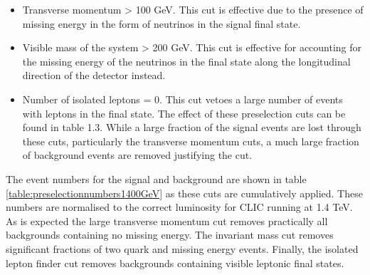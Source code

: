 \begin{itemize}
\item Transverse momentum > 100 GeV. This cut is effective due to the presence of missing energy in the form of neutrinos in the signal final state.
\item Visible mass of the system > 200 GeV. This cut is effective for accounting for the missing energy of the neutrinos in the final state along the longitudinal direction of the detector instead.
\item Number of isolated leptons = 0. This cut vetoes a large number of events with leptons in the final state.
The effect of these preselection cuts can be found in table 1.3. While a large fraction of the signal events are lost through these cuts, particularly the transverse momentum cuts, a much large fraction of background events are removed justifying the cut.
\end{itemize}

The event numbers for the signal and background are shown in table \ref{table:preselectionnumbers1400GeV} as these cuts are cumulatively applied.  These numbers are normalised to the correct luminosity for CLIC running at 1.4 TeV.  As is expected the large transverse momentum cut removes practically all backgrounds containing no missing energy.  The invariant mass cut removes significant fractions of two quark and missing energy events.  Finally, the isolated lepton finder cut removes backgrounds containing visible leptonic final states.  

